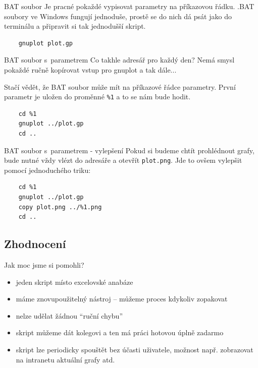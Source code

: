 \documentclass{beamer}
\begin{document}
\begin{frame}[fragile]{BAT soubor}
  Je pracné pokaždé vypisovat parametry na příkazovou řádku. .BAT soubory ve Windows fungují jednoduše, prostě se do nich dá psát jako do terminálu a připravit si tak jednodušší skript.
  \begin{verbatim}
    gnuplot plot.gp
  \end{verbatim}
\end{frame}

\begin{frame}[fragile]{BAT soubor s~parametrem}
  Co takhle adresář pro každý den? Nemá smysl pokaždé ručně kopírovat vstup pro gnuplot a tak dále...

  Stačí vědět, že BAT soubor může mít na příkazové řádce parametry. První parametr je uložen do proměnné \texttt{\%1} a to se nám bude hodit.

  \begin{verbatim}
    cd %1
    gnuplot ../plot.gp
    cd ..
  \end{verbatim}
\end{frame}

\begin{frame}[fragile]{BAT soubor s~parametrem - vylepšení}
  Pokud si budeme chtít prohlédnout grafy, bude nutné vždy vlézt do adresáře a otevřít \texttt{plot.png}. Jde to ovšem vylepšit pomocí jednoduchého triku:

  \begin{verbatim}
    cd %1
    gnuplot ../plot.gp
    copy plot.png ../%1.png
    cd ..
  \end{verbatim}
\end{frame}

\subsection{Zhodnocení}

\begin{frame}{Jak moc jsme si pomohli?}
  \begin{itemize}
    \item jeden skript místo excelovské anabáze
    \item máme znovupoužitelný nástroj -- můžeme proces kdykoliv zopakovat
    \item nelze udělat žádnou ``ruční chybu''
    \item skript můžeme dát kolegovi a ten má práci hotovou úplně zadarmo
    \item skript lze periodicky spouštět bez účasti uživatele, možnost např. zobrazovat na intranetu aktuální grafy atd.
  \end{itemize}
\end{frame}
\end{document}
